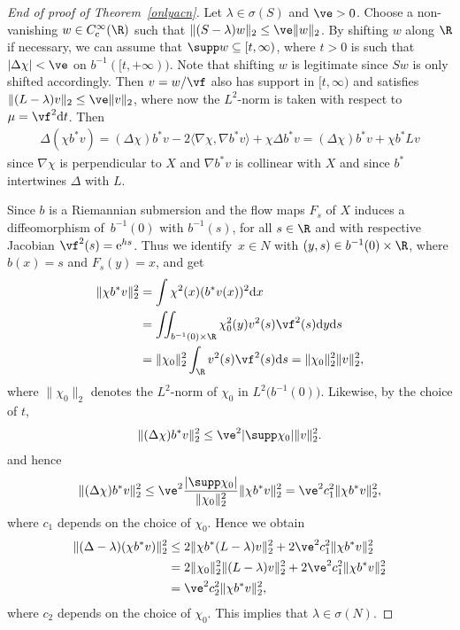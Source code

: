 \begin{proof}[End of proof of Theorem~\ref{onlyacn}]
Let $\lambda\in\sigma(S)$ and $\ve>0$.
Choose a non-vanishing $w\in C^\infty_{\rm c}(\R)$ such that $\|(S-\lambda)w\|_2\le\ve\|w\|_2$.
By shifting $w$ along $\R$ if necessary, we can assume that $\supp w\subseteq[t,\infty)$,
where $t>0$ is such that $|\Delta\chi| < \ve$ on $b^{-1}([t,+\infty))$.
Note that shifting $w$ is legitimate since $Sw$ is only shifted accordingly.
Then $v=w/\vf$ also has support in $[t,\infty)$ and satisfies $\|(L-\lambda)v\|_2\le\ve\|v\|_2$,
where now the $L^2$-norm is taken with respect to $\mu=\vf^2{\rm d}t$.
Then
\begin{align*}
	\Delta(\chi b^*v)
	= (\Delta\chi)b^*v - 2\langle\nabla\chi,\nabla b^*v\rangle + \chi\Delta b^*v
	= (\Delta\chi)b^*v + \chi b^*Lv
\end{align*}
since $\nabla\chi$ is perpendicular to $X$ and $\nabla b^*v$ is collinear with $X$
and since $b^*$ intertwines $\Delta$ with $L$.

Since $b$ is a Riemannian submersion and the flow maps $F_s$ of $X$ induces
a diffeomorphism of~$b^{-1}(0)$ with $b^{-1}(s)$,
for all $s\in\R$ and with respective Jacobian $\vf^2(s)={\rm e}^{hs}$.
Thus we identify~$x\in N$ with $(y,s)\in b^{-1}(0)\times\R$, where $b(x)=s$ and $F_s(y)=x$,
and get
\begin{align*}%
	\|\chi b^*v\|_2^2
	&= \int \chi^2(x)(b^*v(x))^2{\rm d}x \\
	&= \iint_{b^{-1}(0)\times\R}\chi_0^2(y)v^2(s)\vf^2(s){\rm d}y{\rm d}s \\
	&= \|\chi_0\|_2^2 \int_\R v^2(s)\vf^2(s){\rm d}s
	= \|\chi_0\|_2^2 \|v\|_2^2,
\end{align*}
where $\|\chi_0\|_2$ denotes the $L^2$-norm of $\chi_0$ in $L^2\bigl(b^{-1}(0)\bigr)$.
Likewise, by the choice of $t$,
\begin{align*}%
	\|(\Delta\chi)b^*v\|_2^2
	\le \ve^2|\supp\chi_0| \|v\|_2^2.
\end{align*}
and hence
\begin{align*}%
	\|(\Delta\chi)b^*v\|_2^2
	\le \ve^2\frac{|\supp\chi_0|}{ \|\chi_0\|_2^2}\|\chi b^*v\|_2^2
	= \ve^2c_1^2\|\chi b^*v\|_2^2,
\end{align*}
where $c_1$ depends on the choice of $\chi_0$.
Hence we obtain
\begin{align*}%
	\|(\Delta-\lambda)(\chi b^*v)\|_2^2
	&\le 2\|\chi b^*(L-\lambda)v\|_2^2 + 2\ve^2c_1^2\|\chi b^*v\|_2^2 \\
	&= 2\|\chi_0\|_2^2 \|(L-\lambda)v\|_2^2 + 2\ve^2c_1^2\|\chi b^*v\|_2^2 \\
	&= \ve^2c_2^2\|\chi b^*v\|_2^2,
\end{align*}
where $c_2$ depends on the choice of $\chi_0$.
This implies that $\lambda\in\sigma(N)$.
\end{proof}
